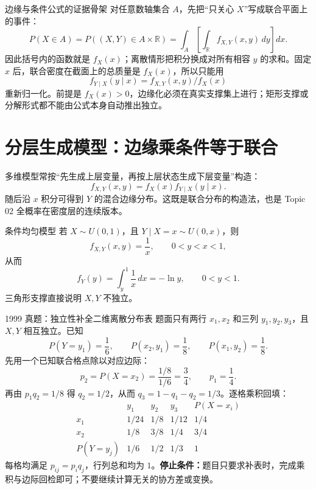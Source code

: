 \documentclass[11pt,a4paper]{ctexart}
\begin{document}
\begin{methodbox}{边缘与条件公式的证据骨架}
对任意数轴集合 $A$，先把“只关心 $X$”写成联合平面上的事件：
\[
P(X\in A)=P((X,Y)\in A\times\mathbb R)
 =\int_A\!\left[\int_{\mathbb R}f_{X,Y}(x,y)\,dy\right]dx.
\]
因此括号内的函数就是 $f_X(x)$；离散情形把积分换成对所有相容 $y$ 的求和。固定 $x$ 后，联合密度在截面上的总质量是 $f_X(x)$，所以只能用
\[
f_{Y\mid X}(y\mid x)=f_{X,Y}(x,y)/f_X(x)
\]
重新归一化。前提是 $f_X(x)>0$，边缘化必须在真实支撑集上进行；矩形支撑或分解形式都不能由公式本身自动推出独立。
\end{methodbox}

\section{分层生成模型：边缘乘条件等于联合}

多维模型常按“先生成上层变量，再按上层状态生成下层变量”构造：
\[
\boxed{f_{X,Y}(x,y)=f_X(x)f_{Y\mid X}(y\mid x)}.
\]
随后沿 $x$ 积分可得到 $Y$ 的混合边缘分布。这既是联合分布的构造法，也是 Topic 02 全概率在密度层的连续版本。

\begin{examplebox}{条件均匀模型}
若 $X\sim U(0,1)$，且 $Y\mid X=x\sim U(0,x)$，则
\[
f_{X,Y}(x,y)=\frac1x,\qquad0<y<x<1,
\]
从而
\[
f_Y(y)=\int_y^1\frac1x\,dx=-\ln y,\qquad0<y<1.
\]
三角形支撑直接说明 $X,Y$ 不独立。
\end{examplebox}

\begin{examplebox}{1999 真题：独立性补全二维离散分布表}
题面只有两行 $x_1,x_2$ 和三列 $y_1,y_2,y_3$，且 $X,Y$ 相互独立。已知
\[
P(Y=y_1)=\frac16,\qquad P(x_2,y_1)=\frac18,
\qquad P(x_1,y_2)=\frac18.
\]
先用一个已知联合格点除以对应边际：
\[
p_2=P(X=x_2)=\frac{1/8}{1/6}=\frac34,
\qquad p_1=\frac14.
\]
再由 $p_1q_2=1/8$ 得 $q_2=1/2$，从而 $q_3=1-q_1-q_2=1/3$。逐格乘积回填：
\[
\begin{array}{c|ccc|c}
 &y_1&y_2&y_3&P(X=x_i)\\\hline
x_1&1/24&1/8&1/12&1/4\\
x_2&1/8&3/8&1/4&3/4\\\hline
P(Y=y_j)&1/6&1/2&1/3&1
\end{array}
\]
每格均满足 $p_{ij}=p_iq_j$，行列总和均为 $1$。\textbf{停止条件：}题目只要求补表时，完成乘积与边际回检即可；不要继续计算无关的协方差或变换。
\end{examplebox}
\end{document}

